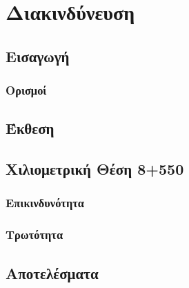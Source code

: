 \newpage
\pagestyle{fancy}

\chapter{Διακινδύνευση}
\label{Ch:risk}

\section{Εισαγωγή}
\lipsum

\subsection{Ορισμοί}

\section{Έκθεση}

\section{Χιλιομετρική Θέση 8+550}
\subsection{Επικινδυνότητα}

\subsection{Τρωτότητα}

\section{Αποτελέσματα}
